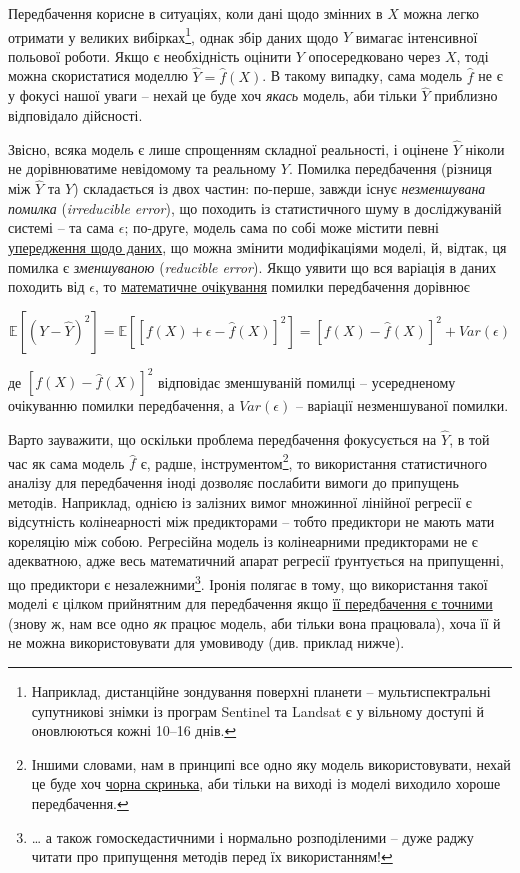 \documentclass[
  11pt,
]{book}
\begin{document}
Передбачення корисне в ситуаціях, коли дані щодо змінних в \(X\) можна легко отримати у великих вибірках\footnote{Наприклад, дистанційне зондування поверхні планети -- мультиспектральні супутникові знімки із програм Sentinel та Landsat є у вільному доступі й оновлюються кожні 10--16 днів.}, однак збір даних щодо \(Y\) вимагає інтенсивної польової роботи. Якщо є необхідність оцінити \(Y\) опосередковано через \(X\), тоді можна скористатися моделлю \(\hat{Y} = \hat{f}(X)\). В такому випадку, сама модель \(\hat{f}\) не є у фокусі нашої уваги -- нехай це буде хоч \emph{якась} модель, аби тільки \(\hat{Y}\) приблизно відповідало дійсності.

Звісно, всяка модель є лише спрощенням складної реальності, і оцінене \(\hat{Y}\) ніколи не дорівнюватиме невідомому та реальному \(Y\). Помилка передбачення (різниця між \(\hat{Y}\) та \(Y\)) складається із двох частин: по-перше, завжди існує \emph{незменшувана помилка} (\emph{irreducible error}), що походить із статистичного шуму в досліджуваній системі -- та сама \(\epsilon\); по-друге, модель сама по собі може містити певні \hyperref[bias-variance]{упередження щодо даних}, що можна змінити модифікаціями моделі, й, відтак, ця помилка є \emph{зменшуваною} (\emph{reducible error}). Якщо уявити що вся варіація в даних походить від \(\epsilon\), то \hyperref[pdfs]{математичне очікування} помилки передбачення дорівнює

\[\mathbb{E}[(Y - \hat{Y})^2] = \mathbb{E} [[f(X) + \epsilon - \hat{f}(X)]^2] = [f(X) - \hat{f}(X)]^2 + Var(\epsilon)\]

де \([f(X) - \hat{f}(X)]^2\) відповідає зменшуваній помилці -- усередненому очікуванню помилки передбачення, а \(Var(\epsilon)\) -- варіації незменшуваної помилки.

Варто зауважити, що оскільки проблема передбачення фокусується на \(\hat{Y}\), в той час як сама модель \(\hat{f}\) є, радше, інструментом\footnote{Іншими словами, нам в принципі все одно яку модель використовувати, нехай це буде хоч \href{https://uk.wikipedia.org/wiki/\%D0\%A7\%D0\%BE\%D1\%80\%D0\%BD\%D0\%B8\%D0\%B9_\%D1\%8F\%D1\%89\%D0\%B8\%D0\%BA}{чорна скринька}, аби тільки на виході із моделі виходило хороше передбачення.}, то використання статистичного аналізу для передбачення іноді дозволяє послабити вимоги до припущень методів. Наприклад, однією із залізних вимог множинної лінійної регресії є відсутність колінеарності між предикторами -- тобто предиктори не мають мати кореляцію між собою. Регресійна модель із колінеарними предикторами не є адекватною, адже весь математичний апарат регресії ґрунтується на припущенні, що предиктори є незалежними\footnote{\ldots{} а також гомоскедастичними і нормально розподіленими -- дуже раджу читати про припущення методів перед їх використанням!}. Іронія полягає в тому, що використання такої моделі є цілком прийнятним для передбачення якщо \hyperref[crossval]{її передбачення є точними} (знову ж, нам все одно \emph{як} працює модель, аби тільки вона працювала), хоча її й не можна використовувати для умовиводу (див. приклад нижче).
\end{document}
